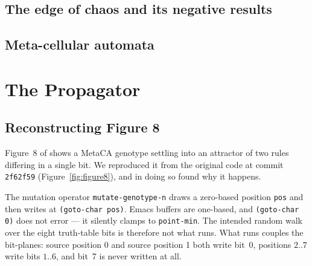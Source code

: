 \documentclass[man,12pt,floatsintext]{apa7}
\newif\ifdraftnotes
\newcommand{\dnote}[1]{\ifdraftnotes\textcolor{notecol}{\small\textbf{[NOTE:} #1\textbf{]}}\fi}
\begin{document}
\subsection{The edge of chaos and its negative results}

\dnote{Wanted here: $\lambda$ \parencite{langton1990computation}; Packard's
evolution toward the critical regime; and
\textcite{mitchell1993revisiting} as our closest ancestor --- they found
the evolved automata were exploiting something other than criticality, we
find the measurement itself is not well-posed. Their negative is
empirical; ours has \textcite{culik1988undecidability} behind it. That
contrast is the paper's position in the literature and should be stated
explicitly.}

\subsection{Meta-cellular automata}

\dnote{Wanted: the MetaCA setting from \textcite{corneli2015search} ---
each cell carries a \emph{rule byte} (genotype) as well as a state
(phenotype), and rules evolve by mutation and blending with neighbours.
Needs a compact formal statement; currently the reader meets it for the
first time in Section~\ref{sec:reconstruction}, which is too late.}

\section{The Propagator}
\label{sec:propagator}

\subsection{Reconstructing Figure 8}
\label{sec:reconstruction}

Figure~8 of \textcite{corneli2015search} shows a MetaCA genotype settling
into an attractor of two rules differing in a single bit. We reproduced it
from the original code at commit \texttt{2f62f59}
(Figure~\ref{fig:figure8}), and in doing so found why it happens.

The mutation operator \texttt{mutate-genotype-n} draws a zero-based
position \texttt{pos} and then writes at \texttt{(goto-char pos)}. Emacs
buffers are one-based, and \texttt{(goto-char 0)} does not error --- it
silently clamps to \texttt{point-min}. The intended random walk over the
eight truth-table bits is therefore not what runs. What runs couples the
bit-planes: source position 0 and source position 1 both write bit~0,
positions $2..7$ write bits $1..6$, and bit~7 is never written at all.
\end{document}
